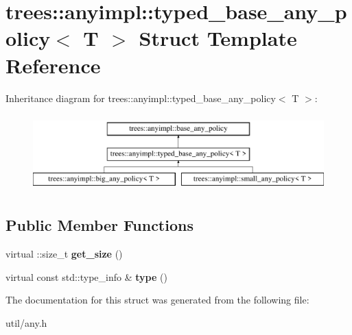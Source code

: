 \hypertarget{structtrees_1_1anyimpl_1_1typed__base__any__policy}{}\section{trees\+:\+:anyimpl\+:\+:typed\+\_\+base\+\_\+any\+\_\+policy$<$ T $>$ Struct Template Reference}
\label{structtrees_1_1anyimpl_1_1typed__base__any__policy}
Inheritance diagram for trees\+:\+:anyimpl\+:\+:typed\+\_\+base\+\_\+any\+\_\+policy$<$ T $>$\+:\begin{figure}[H]
\begin{center}
\leavevmode
\includegraphics[height=3.000000cm]{structtrees_1_1anyimpl_1_1typed__base__any__policy}
\end{center}
\end{figure}
\subsection*{Public Member Functions}
\begin{DoxyCompactItemize}
\item 
\mbox{\label{structtrees_1_1anyimpl_1_1typed__base__any__policy_a8d6c211c812bfa394a34125a09ea286b}} 
virtual \+::size\+\_\+t {\bfseries get\+\_\+size} ()
\item 
\mbox{\label{structtrees_1_1anyimpl_1_1typed__base__any__policy_af9870525db7bb196331083b38552713d}} 
virtual const std\+::type\+\_\+info \& {\bfseries type} ()
\end{DoxyCompactItemize}


The documentation for this struct was generated from the following file\+:\begin{DoxyCompactItemize}
\item 
util/any.\+h\end{DoxyCompactItemize}
